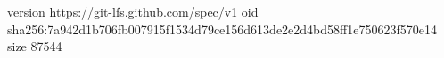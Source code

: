 version https://git-lfs.github.com/spec/v1
oid sha256:7a942d1b706fb007915f1534d79ce156d613de2e2d4bd58ff1e750623f570e14
size 87544
